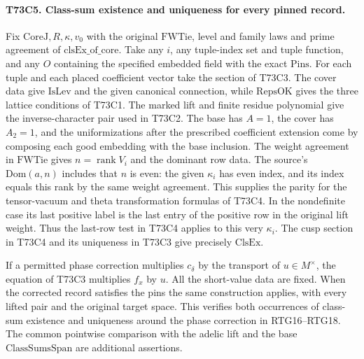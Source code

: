 \paragraph{T73C5. Class-sum existence and uniqueness for every pinned record.}
Fix $\mathrm{CoreJ},R,\kappa,v_0$ with the original
$\mathrm{FWTie}$, level and family laws and prime agreement
of $\mathrm{clsEx\_of\_core}$. Take any $i$, any tuple-index
set and tuple function, and any $O$ containing the specified
embedded field with the exact $\mathrm{Pins}$. For each tuple
and each placed coefficient vector take the section of T73C3.
The cover data give $\mathrm{IsLev}$ and the given canonical
connection, while $\mathrm{RepsOK}$ gives the three lattice
conditions of T73C1. The marked lift and finite residue
polynomial give the inverse-character pair used in T73C2.
The base has $A=1$, the cover has $A_2=1$, and the uniformizations
after the prescribed coefficient extension come by composing
each good embedding with the base inclusion. The weight
agreement in $\mathrm{FWTie}$ gives $n=\operatorname{rank} V_i$
and the dominant row data. The source's $\mathrm{Dom}(a,n)$
includes that $n$ is even: the given $\kappa_i$ has even index,
and its index equals this rank by the same weight agreement.
This supplies the parity for the tensor-vacuum and theta
transformation formulas of T73C4. In the nondefinite case its last
positive label is the last entry of the positive row in the
original lift weight. Thus the last-row test in T73C4 applies
to this very $\kappa_i$. The cusp section in T73C4 and its
uniqueness in T73C3 give precisely $\mathrm{ClsEx}$.

If a permitted phase correction multiplies $c_\delta$ by the
transport of $u\in M^\times$, the equation of T73C3 multiplies
$f_x$ by $u$. All the short-value data are fixed. When the
corrected record satisfies the pins the same construction
applies, with every lifted pair and the original target space.
This verifies both occurrences of class-sum existence and
uniqueness around the phase correction in RTG16--RTG18.
The common pointwise comparison with the adelic lift and the
base $\mathrm{ClassSumsSpan}$ are additional assertions.
